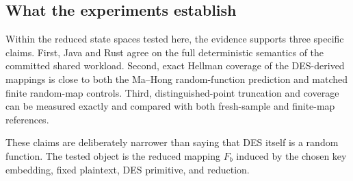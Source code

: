 \subsection{What the experiments establish}

Within the reduced state spaces tested here, the evidence supports three
specific claims. First, Java and Rust agree on the full deterministic semantics
of the committed shared workload. Second, exact Hellman coverage of the
DES-derived mappings is close to both the Ma--Hong random-function prediction
and matched finite random-map controls. Third, distinguished-point truncation
and coverage can be measured exactly and compared with both fresh-sample and
finite-map references.

These claims are deliberately narrower than saying that DES itself is a random
function. The tested object is the reduced mapping $F_b$ induced by the chosen
key embedding, fixed plaintext, DES primitive, and reduction.
